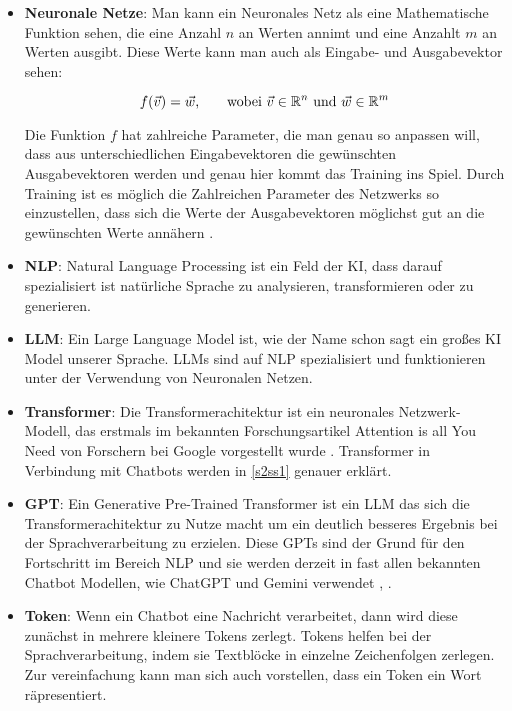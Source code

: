 	\begin{itemize}
		\item \textbf{Neuronale Netze}: Man kann ein Neuronales Netz als eine Mathematische Funktion sehen,
		die eine Anzahl $n$ an Werten annimt und eine Anzahlt $m$ an Werten ausgibt. Diese Werte kann man auch als Eingabe-
		und Ausgabevektor sehen: 		
		
		\begin{equation}\label{nueral_network_function}	
			f(\vec{v}) = \vec{w}\textnormal{,\qquad wobei } \vec{v} \in \mathbb{R}^n \textnormal{ und } \vec{w} \in \mathbb{R}^m
		\end{equation}  
		\vspace{0.0cm}

		Die Funktion $f$ hat zahlreiche Parameter, die man genau so anpassen will, dass aus unterschiedlichen 
		Eingabevektoren die gewünschten Ausgabevektoren werden und genau hier kommt das Training ins Spiel. Durch
		Training ist es möglich die Zahlreichen Parameter des Netzwerks so einzustellen, dass sich die Werte der 
		Ausgabevektoren möglichst gut an die gewünschten Werte annähern \cite[S. 4f]{aggarwal2018}.  
		
		\item \textbf{NLP}: Natural Language Processing ist ein Feld der KI, dass darauf spezialisiert ist natürliche 
		Sprache zu analysieren, transformieren oder zu generieren.  
		
		\item \textbf{LLM}: Ein Large Language Model ist, wie der Name schon sagt ein großes KI Model unserer Sprache.
		LLMs sind auf NLP spezialisiert und funktionieren unter der Verwendung von Neuronalen Netzen.

		\item \textbf{Transformer}: Die Transformerachitektur ist ein neuronales Netzwerk-Modell, das erstmals im 
		bekannten Forschungsartikel \glqq{}Attention is all You Need\grqq{} von Forschern bei Google vorgestellt wurde 
		\cite{vaswani2017}. Transformer in Verbindung mit Chatbots werden in \ref{s2ss1} genauer erklärt.
		
		\item \textbf{GPT}: Ein Generative Pre-Trained Transformer ist ein LLM das sich die Transformerachitektur 
		zu Nutze macht um ein deutlich besseres Ergebnis bei der Sprachverarbeitung zu erzielen. Diese GPTs sind
		der Grund für den Fortschritt im Bereich NLP und sie werden derzeit in fast allen bekannten Chatbot Modellen, 
		wie ChatGPT und Gemini verwendet \cite[S. 2]{gemini2024}, \cite[S. 1]{openAI2024}.  
		
		\item \textbf{Token}: Wenn ein Chatbot eine Nachricht verarbeitet, dann wird diese zunächst in mehrere kleinere 
		Tokens zerlegt. Tokens helfen bei der Sprachverarbeitung, indem sie Textblöcke in einzelne Zeichenfolgen zerlegen.  
		Zur vereinfachung kann man sich auch vorstellen, dass ein Token ein Wort räpresentiert.   
	\end{itemize}	
	\clearpage
	

